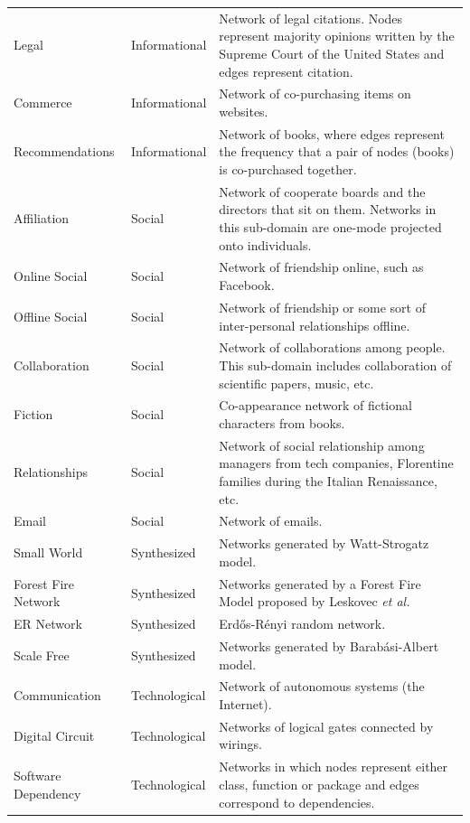 \documentclass{article}
\begin{document}
\begin{longtable}{| l | l | p{9cm} |}
      Legal &  Informational & Network of legal citations. Nodes represent majority opinions written by the Supreme Court of the United States and edges represent citation.\\ %
      Commerce &  Informational & Network of co-purchasing items on websites.\\  %
      Recommendations &  Informational & Network of books, where edges represent the frequency that a pair of nodes (books) is co-purchased together.\\  %
      Affiliation &  Social & Network of cooperate boards and the directors that sit on them. Networks in this sub-domain are one-mode projected onto individuals.\\  %
      Online Social &  Social & Network of friendship online, such as Facebook.\\  %
      Offline Social &  Social & Network of friendship or some sort of inter-personal relationships offline.\\  %
      Collaboration &  Social & Network of collaborations among people. This sub-domain includes collaboration of scientific papers, music, etc.\\  %
      Fiction &  Social & Co-appearance network of fictional characters from books.\\  %
      Relationships &  Social & Network of social relationship among managers from tech companies, Florentine families during the Italian Renaissance, etc.\\ %
      Email &  Social & Network of emails.\\ %
      Small World &  Synthesized & Networks generated by Watt-Strogatz model.\\  %
      Forest Fire Network &  Synthesized & Networks generated by a Forest Fire Model proposed by Leskovec \textit{et al.} \\  %
      ER Network &  Synthesized & Erd\H{o}s-R\'enyi random network. \\  %
      Scale Free &  Synthesized & Networks generated by Barab\'asi-Albert model.\\  %
      Communication &  Technological & Network of autonomous systems (the Internet).\\  %
      Digital Circuit &  Technological & Networks of logical gates connected by wirings.\\ %
      Software Dependency &  Technological & Networks in which nodes represent either class, function or package and edges correspond to dependencies.\\  %

\end{longtable}
\end{document}
